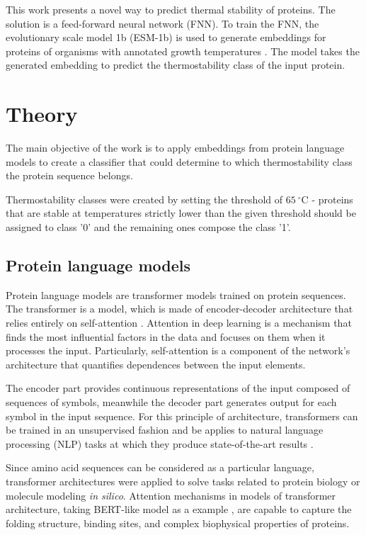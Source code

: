 \documentclass[12pt]{article}
\begin{document}
	This work presents a novel way to predict thermal stability of proteins. 
	The solution is a feed-forward neural network (FNN). To train the FNN, 
	the evolutionary scale model 1b (ESM-1b)\cite{rives2021biological} is used to 
	generate embeddings for proteins of organisms with annotated growth 
	temperatures \cite{engqvist_martin_karl_magnus_2018_1175609}. The model 
	takes the generated embedding to predict the thermostability class of the 
	input protein.

	\newpage

	\section{Theory}

	The main objective of the work is to apply embeddings from protein language 
	models to create a classifier that could determine to which thermostability 
	class the protein sequence belongs.

	Thermostability classes were created by setting the threshold of 
	$65\ ^\circ$C - proteins that are stable at temperatures strictly lower 
	than the given threshold should be assigned to class '0' and the 
	remaining ones compose the class '1'. 

	\subsection{Protein language models}

	Protein language models are transformer models trained on protein sequences.
	The transformer is a model, which is made of encoder-decoder architecture 
	that relies entirely on self-attention \cite{vaswani2017attention}. 
	Attention in deep learning is a mechanism that finds the most influential
	factors in the data and focuses on them when it processes the input. 
	Particularly, self-attention is a component of the network's architecture
	that quantifies dependences between the input elements.

	The encoder part provides continuous representations of the input composed 
	of sequences of symbols, meanwhile the decoder part generates output for each 
	symbol in the input sequence. For this principle of architecture, transformers
	can be trained in an unsupervised fashion and be applies to natural language
	processing (NLP) tasks at which they produce state-of-the-art 
	results \cite{vig2019analyzing}.

	Since amino acid sequences can be considered as a particular language, 
	transformer architectures were applied to solve tasks related to protein 
	biology or molecule modeling \textit{in silico}. Attention mechanisms in 
	models of transformer architecture, taking BERT-like model as a example 
	\cite{vig2020bertology}, are capable to capture the folding structure, 
	binding sites, and complex biophysical properties of proteins.
\end{document}
